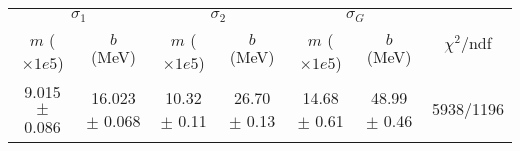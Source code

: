 \begin{tabular}{cc|cc|cc||c}
\multicolumn{2}{c|}{$\sigma_1$} & \multicolumn{2}{|c}{$\sigma_2$} & \multicolumn{2}{|c}{$\sigma_G$}  & \multirow{2}{*}{$\chi^2/$ndf}\\
$m$ ($\times1e5$) & $b$ (MeV) & $m$ ($\times1e5$) & $b$ (MeV) & $m$ ($\times1e5$) & $b$ (MeV) & \\
\hline
9.015 $\pm$ 0.086 & 16.023 $\pm$ 0.068 & 10.32 $\pm$ 0.11 & 26.70 $\pm$ 0.13 & 14.68 $\pm$ 0.61 & 48.99 $\pm$ 0.46 & 5938/1196\\
\end{tabular}
